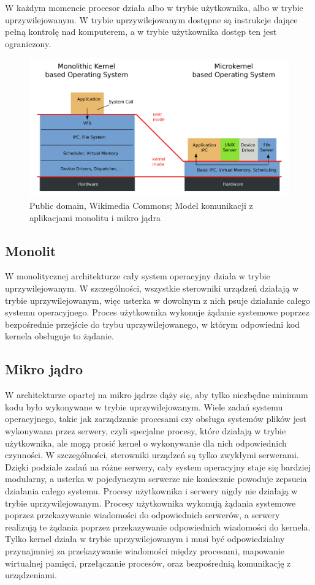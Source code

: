 W każdym momencie procesor działa albo w trybie użytkownika, albo w trybie uprzywilejowanym. W trybie uprzywilejowanym dostępne są instrukcje dające pełną kontrolę nad komputerem, a w trybie użytkownika dostęp ten jest ograniczony.

\begin{figure}[H]
	\centering
	\includegraphics[width=12cm]{chapters/sysopy/monolit/2560px-OS-structure.svg.png}
	\caption{Public domain, Wikimedia Commons; Model komunikacji z aplikacjami monolitu i mikro jądra}
\end{figure}

\subsection{Monolit}
W monolitycznej architekturze cały system operacyjny działa w trybie uprzywilejowanym. W szczególności, wszystkie sterowniki urządzeń działają w trybie uprzywilejowanym, więc usterka w dowolnym z nich psuje działanie całego systemu operacyjnego. Proces użytkownika wykonuje żądanie systemowe poprzez bezpośrednie przejście do trybu uprzywilejowanego, w którym odpowiedni kod kernela obsługuje to żądanie.

\subsection{Mikro jądro}
W architekturze opartej na mikro jądrze dąży się, aby tylko niezbędne minimum kodu było wykonywane w trybie uprzywilejowanym. Wiele zadań systemu operacyjnego, takie jak zarządzanie procesami czy obsługa systemów plików jest wykonywana przez serwery, czyli specjalne procesy, które działają w trybie użytkownika, ale mogą prosić kernel o wykonywanie dla nich odpowiednich czynności. W szczególności, sterowniki urządzeń są tylko zwykłymi serwerami. Dzięki podziale zadań na różne serwery, cały system operacyjny staje się bardziej modularny, a usterka w pojedynczym serwerze nie koniecznie powoduje zepsucia działania całego systemu. Procesy użytkownika i serwery nigdy nie działają w trybie uprzywilejowanym. Procesy użytkownika wykonują żądania systemowe poprzez przekazywanie wiadomości do odpowiednich serwerów, a serwery realizują te żądania poprzez przekazywanie odpowiednich wiadomości do kernela. Tylko kernel działa w trybie uprzywilejowanym i musi być odpowiedzialny przynajmniej za przekazywanie wiadomości między procesami, mapowanie wirtualnej pamięci, przełączanie procesów, oraz bezpośrednią komunikację z urządzeniami.

